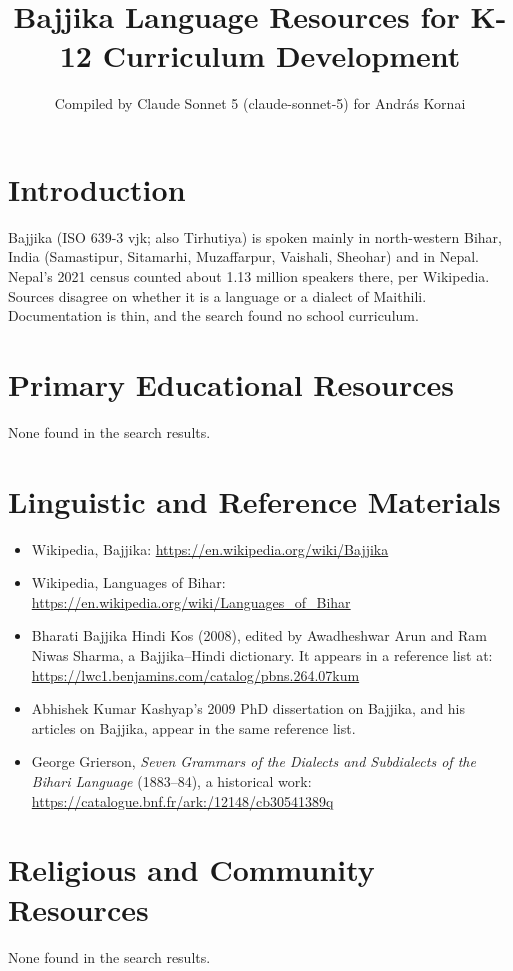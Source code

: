\documentclass[12pt]{article}
\title{Bajjika Language Resources for K-12 Curriculum Development}
\author{Compiled by Claude Sonnet 5 (claude-sonnet-5) for Andr\'as Kornai}
\date{}
\begin{document}
\maketitle

\section{Introduction}
Bajjika (ISO 639-3 vjk; also Tirhutiya) is spoken mainly in north-western Bihar, India (Samastipur, Sitamarhi, Muzaffarpur, Vaishali, Sheohar) and in Nepal. Nepal's 2021 census counted about 1.13 million speakers there, per Wikipedia. Sources disagree on whether it is a language or a dialect of Maithili. Documentation is thin, and the search found no school curriculum.

\section{Primary Educational Resources}
None found in the search results.

\section{Linguistic and Reference Materials}
\begin{itemize}
\item Wikipedia, Bajjika: \url{https://en.wikipedia.org/wiki/Bajjika}
\item Wikipedia, Languages of Bihar: \url{https://en.wikipedia.org/wiki/Languages_of_Bihar}
\item Bharati Bajjika Hindi Kos (2008), edited by Awadheshwar Arun and Ram Niwas Sharma, a Bajjika--Hindi dictionary. It appears in a reference list at: \url{https://lwc1.benjamins.com/catalog/pbns.264.07kum}
\item Abhishek Kumar Kashyap's 2009 PhD dissertation on Bajjika, and his articles on Bajjika, appear in the same reference list.
\item George Grierson, \emph{Seven Grammars of the Dialects and Subdialects of the Bihari Language} (1883--84), a historical work: \url{https://catalogue.bnf.fr/ark:/12148/cb30541389q}
\end{itemize}

\section{Religious and Community Resources}
None found in the search results.
\end{document}
